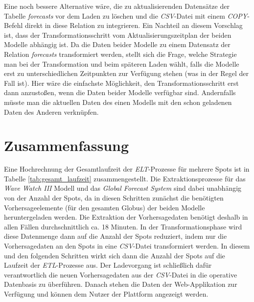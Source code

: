 Eine noch bessere Alternative wäre, die zu aktualisierenden Datensätze
der Tabelle \textit{forecasts} vor dem Laden zu löschen und die
\textit{CSV}-Datei mit einem \textit{COPY}-Befehl direkt in diese
Relation zu integrieren. Ein Nachteil an diesem Vorschlag ist, dass
der Transformationsschritt vom Aktualisierungszeitplan der beiden
Modelle abhängig ist. Da die Daten beider Modelle zu einem Datensatz
der Relation \textit{forecasts} transformiert werden, stellt sich die
Frage, welche Strategie man bei der Transformation und beim späteren
Laden wählt, falls die Modelle erst zu unterschiedlichen Zeitpunkten
zur Verfügung stehen (was in der Regel der Fall ist). Hier wäre die
einfachste Möglichkeit, den Transformationsschritt erst dann
anzustoßen, wenn die Daten beider Modelle verfügbar sind. Andernfalls
müsste man die aktuellen Daten des einen Modells mit den schon
geladenen Daten des Anderen verknüpfen.

\section{Zusammenfassung}
Eine Hochrechnung der Gesamtlaufzeit der \textit{ELT}-Prozesse für
mehrere Spots ist in Tabelle \ref{tab:gesamt_laufzeit}
zusammengestellt. Die Extraktionsprozesse für das \textit{Wave Watch
  III} Modell und das \textit{Global Forecast System} sind dabei
unabhängig von der Anzahl der Spots, da in diesen Schritten zunächst
die benötigten Vorhersageelemente (für den gesamten Globus) der beiden
Modelle heruntergeladen werden. Die Extraktion der Vorhersagedaten
benötigt deshalb in allen Fällen durchschnittlich ca. 18 Minuten. In
der Transformationsphase wird diese Datenmenge dann auf die Anzahl der
Spots reduziert, indem nur die Vorhersagedaten an den Spots in eine
\textit{CSV}-Datei transformiert werden. In diesem und den folgenden
Schritten wirkt sich dann die Anzahl der Spots auf die Laufzeit der
\textit{ETL}-Prozesse aus. Der Ladevorgang ist schließlich dafür
verantwortlich die neuen Vorhersagedaten aus der \textit{CSV}-Datei in
die operative Datenbasis zu überführen. Danach stehen die Daten der
Web-Applikation zur Verfügung und können dem Nutzer der Plattform
angezeigt werden. 

